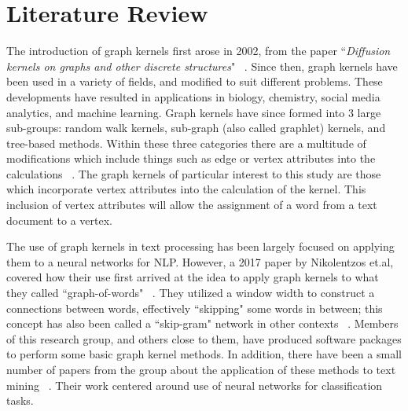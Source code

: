 %
%
%

\chapter{Literature Review}
\label{literature-review}




The introduction of graph kernels first arose in 2002, from the paper ``\textit{Diffusion kernels on graphs and other discrete structures}" ~\cite{kondor2002diffusion}. Since then, graph kernels have been used in a variety of fields, and modified to suit different problems. These developments have resulted in applications in biology, chemistry, social media analytics, and machine learning. Graph kernels have since formed into 3 large sub-groups: random walk kernels, sub-graph (also called graphlet) kernels, and tree-based methods. Within these three categories there are a multitude of modifications which include things such as edge or vertex attributes into the calculations ~\cite{vishwanathan2010graph}. The graph kernels of particular interest to this study are those which incorporate vertex attributes into the calculation of the kernel.  This inclusion of vertex attributes will allow the assignment of a word from a text document to a vertex. 

The use of graph kernels in text processing has been largely focused on applying them to a neural networks for NLP. However, a 2017 paper by Nikolentzos et.al, covered how their use first arrived at the idea to apply graph kernels to what they called ``graph-of-words" ~\cite{nikolentzos2017shortest}. They utilized a window width to construct a connections between words, effectively ``skipping" some words in between; this concept has also been called a ``skip-gram" network in other contexts ~\cite{cheng2006n}. Members of this research group, and others close to them, have produced software packages to perform some basic graph kernel methods. In addition, there have been a small number of papers from the group about the application of these methods to text mining ~\cite{sugiyama2018graphkernels}. Their work centered around use of neural networks for classification tasks. 



